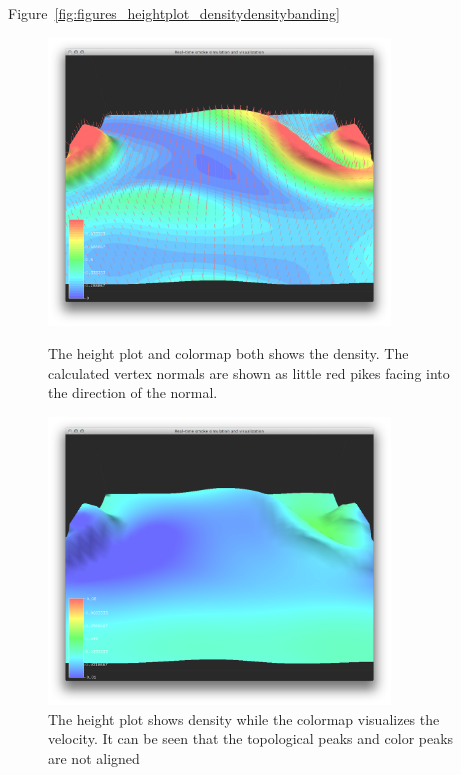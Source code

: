 Figure~\ref{fig:figures_heightplot_densitydensitybanding}


\begin{figure}[htbp]
\centering
\begin{minipage}[t]{0.48\textwidth}
        \includegraphics[height=3in]{figures/heightplot/densitynormals.png}
        \caption{The height plot and colormap both shows the density. The calculated vertex normals are shown as little red pikes facing into the direction of the normal.}
\label{fig:heighplot_densityNormals}
\end{minipage}\hspace{.04\textwidth}%
\begin{minipage}[t]{0.48\textwidth}
 \includegraphics[height=3in]{figures/heightplot/densityvelocity.png}
    \caption{The height plot shows density while the colormap visualizes the velocity. It can be seen that the topological peaks and color peaks are not aligned }
    \label{fig:heighplot_densityVelocity}
\end{minipage}
\end{figure}

